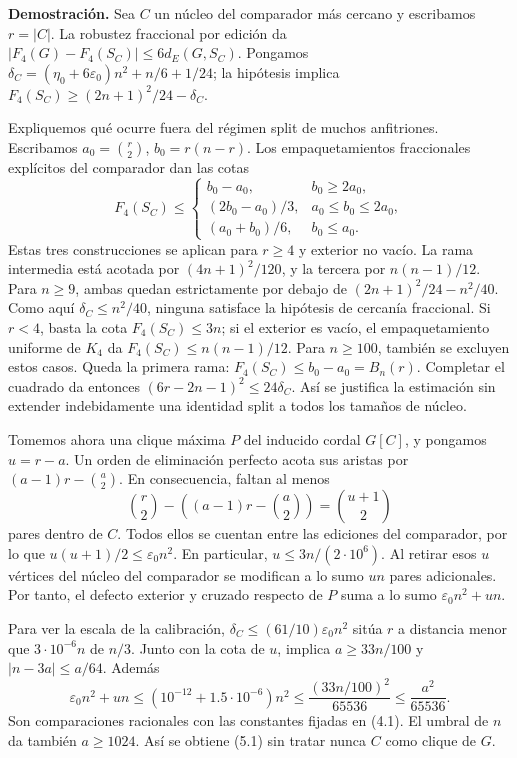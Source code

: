\documentclass[spanish,11pt,a4paper]{article}
\begin{document}
\textbf{Demostración.} Sea \(C\) un núcleo del comparador más cercano y escribamos \(r=|C|\). La robustez fraccional por edición da \(|F_4(G)-F_4(S_C)|\le6d_E(G,S_C)\). Pongamos \(\delta_C=(\eta_0+6\varepsilon_0)n^2+n/6+1/24\); la hipótesis implica \(F_4(S_C)\ge(2n+1)^2/24-\delta_C\).

Expliquemos qué ocurre fuera del régimen split de muchos anfitriones. Escribamos \(a_0=\binom r2\), \(b_0=r(n-r)\). Los empaquetamientos fraccionales explícitos del comparador dan las cotas \[
F_4(S_C)\le
\begin{cases}
b_0-a_0,&b_0\ge2a_0,\\
(2b_0-a_0)/3,&a_0\le b_0\le2a_0,\\
(a_0+b_0)/6,&b_0\le a_0.
\end{cases}
\tag{5.1a}
\] Estas tres construcciones se aplican para \(r\ge4\) y exterior no vacío. La rama intermedia está acotada por \((4n+1)^2/120\), y la tercera por \(n(n-1)/12\). Para \(n\ge9\), ambas quedan estrictamente por debajo de \((2n+1)^2/24-n^2/40\). Como aquí \(\delta_C\le n^2/40\), ninguna satisface la hipótesis de cercanía fraccional. Si \(r<4\), basta la cota \(F_4(S_C)\le3n\); si el exterior es vacío, el empaquetamiento uniforme de \(K_4\) da \(F_4(S_C)\le n(n-1)/12\). Para \(n\ge100\), también se excluyen estos casos. Queda la primera rama: \(F_4(S_C)\le b_0-a_0=B_n(r)\). Completar el cuadrado da entonces \((6r-2n-1)^2\le24\delta_C\). Así se justifica la estimación sin extender indebidamente una identidad split a todos los tamaños de núcleo.

Tomemos ahora una clique máxima \(P\) del inducido cordal \(G[C]\), y pongamos \(u=r-a\). Un orden de eliminación perfecto acota sus aristas por \((a-1)r-\binom a2\). En consecuencia, faltan al menos \[
\binom r2-\left((a-1)r-\binom a2\right)
=\binom{u+1}{2}
\] pares dentro de \(C\). Todos ellos se cuentan entre las ediciones del comparador, por lo que \(u(u+1)/2\le\varepsilon_0n^2\). En particular, \(u\le3n/(2\cdot10^6)\). Al retirar esos \(u\) vértices del núcleo del comparador se modifican a lo sumo \(un\) pares adicionales. Por tanto, el defecto exterior y cruzado respecto de \(P\) suma a lo sumo \(\varepsilon_0n^2+un\).

Para ver la escala de la calibración, \(\delta_C\le(61/10)\varepsilon_0n^2\) sitúa \(r\) a distancia menor que \(3\cdot10^{-6}n\) de \(n/3\). Junto con la cota de \(u\), implica \(a\ge33n/100\) y \(|n-3a|\le a/64\). Además \[
\varepsilon_0n^2+un\le(10^{-12}+1.5\cdot10^{-6})n^2
\le\frac{(33n/100)^2}{65536}\le\frac{a^2}{65536}.
\] Son comparaciones racionales con las constantes fijadas en (4.1). El umbral de \(n\) da también \(a\ge1024\). Así se obtiene (5.1) sin tratar nunca \(C\) como clique de \(G\).
\end{document}
